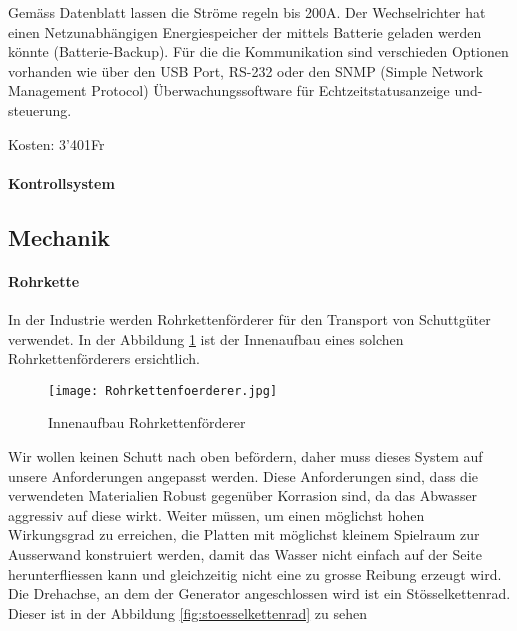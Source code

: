 Gemäss Datenblatt lassen die Ströme regeln bis 200A. 
Der Wechselrichter hat einen Netzunabhängigen Energiespeicher der mittels Batterie geladen werden könnte (Batterie-Backup). Für die die Kommunikation sind verschieden Optionen vorhanden wie über den USB Port, RS-232 oder den SNMP (Simple Network Management Protocol) Überwachungssoftware für Echtzeitstatusanzeige und-steuerung.

Kosten: 3'401\si{Fr}


\paragraph{Kontrollsystem}





\newpage


\subsection{Mechanik}

\paragraph{Rohrkette}

In der Industrie werden Rohrkettenförderer für den Transport von Schuttgüter verwendet. In der Abbildung \ref{fig:Rohrkettenfoerderer}  ist der Innenaufbau eines solchen Rohrkettenförderers ersichtlich.

\begin{figure} [H]
	\centering
	\texttt{[image: Rohrkettenfoerderer.jpg]}
	\caption{Innenaufbau Rohrkettenförderer \cite{abconvey}}
	\label{fig:Rohrkettenfoerderer}
\end{figure}

Wir wollen keinen Schutt nach oben befördern, daher muss dieses System auf unsere Anforderungen angepasst werden. Diese Anforderungen sind, dass die verwendeten Materialien Robust gegenüber Korrasion sind, da das Abwasser aggressiv auf diese wirkt. Weiter müssen, um einen möglichst hohen Wirkungsgrad zu erreichen, die Platten mit möglichst kleinem Spielraum zur Ausserwand konstruiert werden, damit das Wasser nicht einfach auf der Seite herunterfliessen kann und gleichzeitig nicht eine zu grosse Reibung erzeugt wird. Die Drehachse, an dem der Generator angeschlossen wird ist ein Stösselkettenrad. Dieser ist in der Abbildung \ref{fig:stoesselkettenrad}  zu sehen

